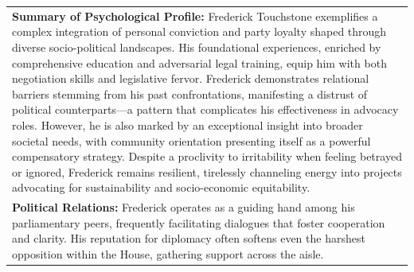 \documentclass[11pt]{article}
\begin{document}
\begin{table}[ht]
\begin{tabularx}{\textwidth}{X}
\textbf{Summary of Psychological Profile:} Frederick Touchstone exemplifies a complex integration of personal conviction and party loyalty shaped through diverse socio-political landscapes. His foundational experiences, enriched by comprehensive education and adversarial legal training, equip him with both negotiation skills and legislative fervor. Frederick demonstrates relational barriers stemming from his past confrontations, manifesting a distrust of political counterparts—a pattern that complicates his effectiveness in advocacy roles. However, he is also marked by an exceptional insight into broader societal needs, with community orientation presenting itself as a powerful compensatory strategy. Despite a proclivity to irritability when feeling betrayed or ignored, Frederick remains resilient, tirelessly channeling energy into projects advocating for sustainability and socio-economic equitability. \\[4pt]

\textbf{Political Relations:} Frederick operates as a guiding hand among his parliamentary peers, frequently facilitating dialogues that foster cooperation and clarity. His reputation for diplomacy often softens even the harshest opposition within the House, gathering support across the aisle. \\


\bottomrule
\end{tabularx}
\end{table}
\end{document}
